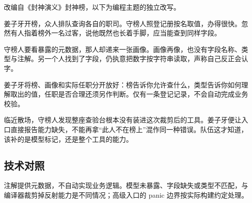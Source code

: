 改编自《封神演义》封神榜，以下为编程主题的独立改写。

姜子牙开榜，众人排队查询各自的职司。守榜人照登记册按名取值，办得很快。忽然有人指着榜外一名过客，说他既然也长着手脚，应当能查到同样字段。

守榜人要看暴露的元数据，那人却递来一张画像。画像再像，也没有字段名称、类型与注解。另一个人找到了字段，仍执意把数字按字符串读取，声称自己反正会认字。

姜子牙将榜、画像和实际任职分开放好：榜告诉你允许查什么，类型告诉你如何理解取出的值，任职是否合理还须另作判断。仅有一条登记记录，不会自动完成业务校验。

临近散场，守榜人发现整座查验台根本没有装进这次裁剪后的工具。姜子牙便让入口直接报告能力缺失，不能再拿“此人不在榜上”混作同一种错误。队伍这才知道，该补的是模型标记，还是整个工具的能力。

\subsection*{技术对照}

注解提供元数据，不自动实现业务逻辑。模型未暴露、字段缺失或类型不匹配，与编译器裁剪掉反射能力是不同情况；高级入口的 panic 边界按实际构建约定处理。
